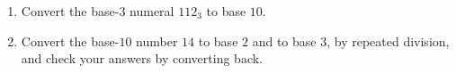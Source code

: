 \begin{enumerate}
\item[(a)] Convert the base-$3$ numeral $112_3$ to base $10$.
\item[(b)] Convert the base-$10$ number $14$ to base $2$ and to base $3$, by repeated division, and check your answers by converting back.
\end{enumerate}
